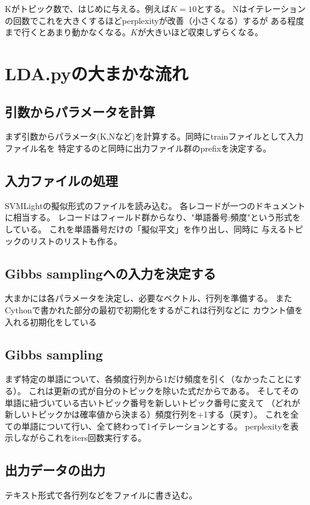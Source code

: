 \documentclass[uplatex]{jsarticle}
\begin{document}
Kがトピック数で、はじめに与える。例えば$K=10$とする。
Nはイテレーションの回数でこれを大きくするほどperplexityが改善（小さくなる）するが
ある程度まで行くとあまり動かなくなる。$K$が大きいほど収束しずらくなる。

\section{LDA.pyの大まかな流れ}
\subsection{引数からパラメータを計算}
まず引数からパラメータ(K,Nなど)を計算する。同時にtrainファイルとして入力ファイル名を
特定するのと同時に出力ファイル群のprefixを決定する。

\subsection{入力ファイルの処理}
SVMLightの擬似形式のファイルを読み込む。
各レコードが一つのドキュメントに相当する。
レコードはフィールド群からなり、"単語番号:頻度"という形式をしている。
これを単語番号だけの「擬似平文」を作り出し、同時に
与えるトピックのリストのリストも作る。

\subsection{Gibbs samplingへの入力を決定する}
大まかには各パラメータを決定し、必要なベクトル、行列を準備する。
またCythonで書かれた部分の最初で初期化をするがこれは行列などに
カウント値を入れる初期化をしている

\subsection{Gibbs sampling}
まず特定の単語について、各頻度行列から1だけ頻度を引く（なかったことにする）。
これは更新の式が自分のトピックを除いた式だからである。
そしてその単語に紐づいている古いトピック番号を新しいトピック番号に変えて
（どれが新しいトピックかは確率値から決まる）頻度行列を+1する（戻す）。
これを全ての単語について行い、全て終わって1イテレーションとする。
perplexityを表示しながらこれをiters回数実行する。

\subsection{出力データの出力}
テキスト形式で各行列などをファイルに書き込む。
\end{document}
